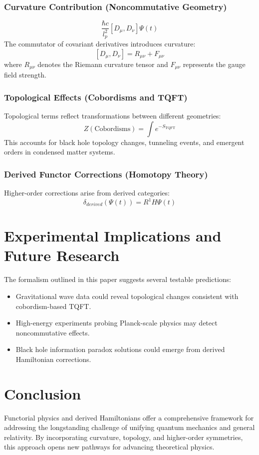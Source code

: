 \documentclass[12pt]{article}
\begin{document}
\subsubsection{Curvature Contribution (Noncommutative Geometry)}
\[
\frac{\hbar c}{l_p^2}[D_\mu, D_\nu]\Psi(t)
\]
The commutator of covariant derivatives introduces curvature:
\[
[D_\mu, D_\nu] = R_{\mu\nu} + F_{\mu\nu}
\]
where \( R_{\mu\nu} \) denotes the Riemann curvature tensor and \( F_{\mu\nu} \) represents the gauge field strength.

\subsubsection{Topological Effects (Cobordisms and TQFT)}
Topological terms reflect transformations between different geometries:
\[
Z(\text{Cobordisms}) = \int e^{-S_{\text{TQFT}}}
\]
This accounts for black hole topology changes, tunneling events, and emergent orders in condensed matter systems.

\subsubsection{Derived Functor Corrections (Homotopy Theory)}
Higher-order corrections arise from derived categories:
\[
\delta_{derived}(\Psi(t)) = R^1 H \Psi(t)
\]

\section{Experimental Implications and Future Research}
The formalism outlined in this paper suggests several testable predictions:
\begin{itemize}
    \item Gravitational wave data could reveal topological changes consistent with cobordism-based TQFT.
    \item High-energy experiments probing Planck-scale physics may detect noncommutative effects.
    \item Black hole information paradox solutions could emerge from derived Hamiltonian corrections.
\end{itemize}

\section{Conclusion}
Functorial physics and derived Hamiltonians offer a comprehensive framework for addressing the longstanding challenge of unifying quantum mechanics and general relativity. By incorporating curvature, topology, and higher-order symmetries, this approach opens new pathways for advancing theoretical physics.
\end{document}
